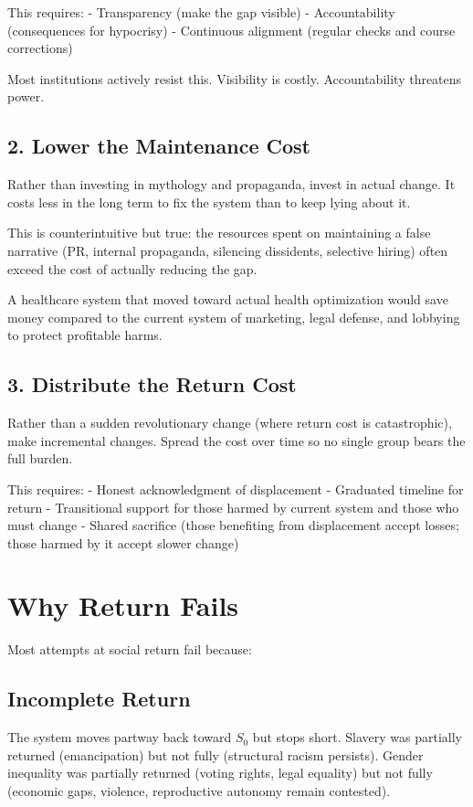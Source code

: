 \documentclass[12pt]{article}
\begin{document}
This requires:
- Transparency (make the gap visible)
- Accountability (consequences for hypocrisy)
- Continuous alignment (regular checks and course corrections)

Most institutions actively resist this. Visibility is costly. Accountability threatens power.

\subsection{2. Lower the Maintenance Cost}

Rather than investing in mythology and propaganda, invest in actual change. It costs less in the long term to fix the system than to keep lying about it.

This is counterintuitive but true: the resources spent on maintaining a false narrative (PR, internal propaganda, silencing dissidents, selective hiring) often exceed the cost of actually reducing the gap.

A healthcare system that moved toward actual health optimization would save money compared to the current system of marketing, legal defense, and lobbying to protect profitable harms.

\subsection{3. Distribute the Return Cost}

Rather than a sudden revolutionary change (where return cost is catastrophic), make incremental changes. Spread the cost over time so no single group bears the full burden.

This requires:
- Honest acknowledgment of displacement
- Graduated timeline for return
- Transitional support for those harmed by current system and those who must change
- Shared sacrifice (those benefiting from displacement accept losses; those harmed by it accept slower change)

\section{Why Return Fails}

Most attempts at social return fail because:

\subsection{Incomplete Return}

The system moves partway back toward $S_0$ but stops short. Slavery was partially returned (emancipation) but not fully (structural racism persists). Gender inequality was partially returned (voting rights, legal equality) but not fully (economic gaps, violence, reproductive autonomy remain contested).
\end{document}
